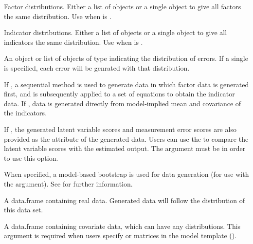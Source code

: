\documentclass[a4paper]{book}
\begin{document}
\begin{Arguments}
\begin{ldescription}
\item[\code{facDist}]  
Factor distributions. Either a list of  objects or a single  object to give all factors the same distribution. Use when  is .

\item[\code{indDist}]  
Indicator distributions. Either a list of  objects or a single  object to give all indicators the same distribution. Use when  is .

\item[\code{errorDist}]  
An object or list of objects of type  indicating the distribution of errors. If a single  is specified, each error will be genrated with that distribution.

\item[\code{sequential}]  
If , a sequential method is used to generate data in which factor data is generated first, and is subsequently applied to a set of equations to obtain the indicator data. If , data is generated directly from model-implied mean and covariance of the indicators.

\item[\code{saveLatentVar}]  
If , the generated latent variable scores and measurement error scores are also provided as the attribute of the generated data. Users can use the  to compare the latent variable scores with the estimated output. The  argument must be  in order to use this option.

\item[\code{modelBoot}]  
When specified, a model-based bootstrap is used for data generation (for use with the  argument). See  for further information.

\item[\code{realData}]  
A data.frame containing real data. Generated data will follow the distribution of this data set.

\item[\code{covData}]  
A data.frame containing covariate data, which can have any distributions. This argument is required when users specify  or  matrices in the model template ().


\end{ldescription}
\end{Arguments}
\end{document}
